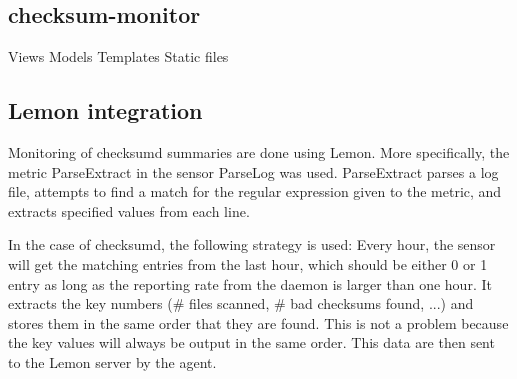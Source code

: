 \subsection{checksum-monitor}
Views
Models
Templates
Static files

\subsection{Lemon integration}
\label{sec:lemon_integration}
Monitoring of checksumd summaries are done using Lemon. More specifically, the metric ParseExtract in the sensor ParseLog was used. ParseExtract parses a log file, attempts to find a match for the regular expression given to the metric, and extracts specified values from each line. 

In the case of checksumd, the following strategy is used: Every hour, the sensor will get the matching entries from the last hour, which should be either 0 or 1 entry as long as the reporting rate from the daemon is larger than one hour. It extracts the key numbers (\# files scanned, \# bad checksums found, ...) and stores them in the same order that they are found. This is not a problem because the key values will always be output in the same order. This data are then sent to the Lemon server by the agent.
